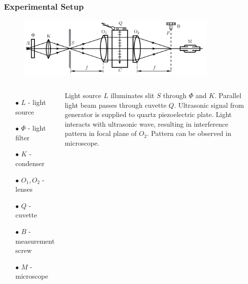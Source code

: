 \documentclass{beamer}
\begin{document}
	\begin{frame}
		\frametitle{Experimental Setup}
		\begin{figure}
			\centering
			\includegraphics[width=10cm]{res/setup1.png}
		\end{figure}
		
		\begin{columns}
			\begin{enumerate}
				\item[$\bullet$] $L$ - light source
				\item[$\bullet$] $\Phi$ - light filter
				\item[$\bullet$] $K$ - condenser
				\item[$\bullet$] $O_1, O_2$ - lenses
				\item[$\bullet$] $Q$ - cuvette
				\item[$\bullet$] $B$ - measurement screw
				\item[$\bullet$] $M$ - microscope
			\end{enumerate}
			Light source $L$ illuminates slit $S$ through $\Phi$ and $K$. Parallel light beam passes through cuvette $Q$. Ultrasonic signal from generator is supplied to quartz piezoelectric plate. Light interacts with ultrasonic wave, resulting in interference pattern in focal plane of $O_2$. Pattern can be observed in microscope.
		\end{columns}
	\end{frame}
	
\end{document}
